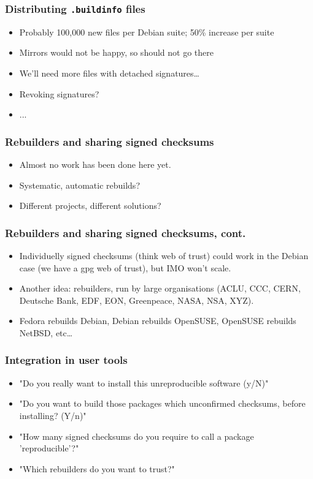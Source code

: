 \documentclass[14pt,aspectratio=169]{beamer}
\begin{document}
\begin{frame}
 \frametitle{Distributing \texttt{.buildinfo} files}
 \begin{itemize}
  \item Probably 100,000 new files per Debian suite; 50\% increase per suite
  \item Mirrors would not be happy, so should not go there
  \item<2> We'll need more files with detached signatures…
  \item<2>{Revoking signatures?}
  \item<2>{...}
 \end{itemize}
\end{frame}

\begin{frame}
 \frametitle{Rebuilders and sharing signed checksums}
 \begin{itemize}
  \item Almost no work has been done here yet.
  \item<2-3> Systematic, automatic rebuilds? 
  \item<3> Different projects, different solutions? 
 \end{itemize}
\end{frame}

\begin{frame}
 \frametitle{Rebuilders and sharing signed checksums, cont.}
 \begin{itemize}
  \item Individuelly signed checksums (think web of trust) could work in the
  Debian case (we have a gpg web of trust), but IMO won't scale.
  \item<2-3> { Another idea: rebuilders, run by large organisations
  (ACLU, CCC, CERN, Deutsche Bank, EDF, EON, Greenpeace, NASA, NSA, XYZ).}
  \item<3> Fedora rebuilds Debian, Debian rebuilds OpenSUSE, OpenSUSE rebuilds
  NetBSD, etc…
 \end{itemize}
\end{frame}


\begin{frame}
 \frametitle{Integration in user tools}
 \begin{itemize}
  \item "Do you really want to install this unreproducible software (y/N)"
  \item<2-4> "Do you want to build those packages which unconfirmed checksums,
  before installing? (Y/n)"
  \item<3-4>{ "How many signed checksums do you require to call a package
  'reproducible'?"}
  \item<4>{ "Which rebuilders do you want to trust?"}
 \end{itemize}
\end{frame}
\end{document}
